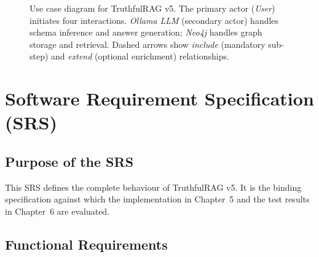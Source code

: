 \begin{figure}[H]
{}
\caption{Use case diagram for TruthfulRAG v5. The primary actor (\emph{User})
initiates four interactions. \emph{Ollama LLM} (secondary actor) handles schema
inference and answer generation; \emph{Neo4j} handles graph storage and
retrieval. Dashed arrows show \textit{include} (mandatory sub-step) and
\textit{extend} (optional enrichment) relationships.}
\label{fig:usecase}
\end{figure}

\section{Software Requirement Specification (SRS)}

\subsection{Purpose of the SRS}

This SRS defines the complete behaviour of TruthfulRAG v5. It is the binding
specification against which the implementation in Chapter~5 and the test results
in Chapter~6 are evaluated.

\subsection{Functional Requirements}

